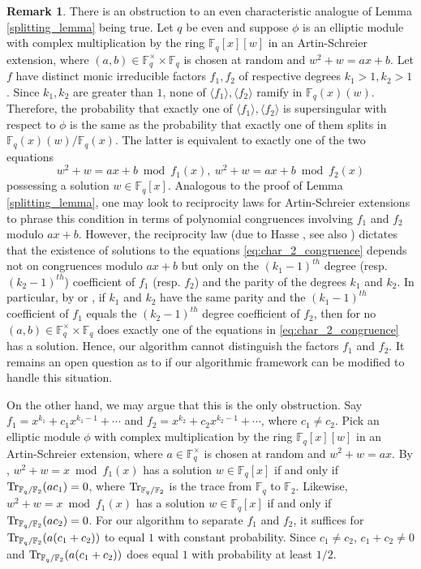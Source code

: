 \documentclass[11pt]{article}
\theoremstyle{definition}
\newtheorem{remark}{Remark}
\def\F{\ensuremath{\mathbb{F}}}
\begin{document}
\begin{remark} \label{rk:obstruction}
There is an obstruction to an even characteristic analogue of Lemma
\ref{splitting_lemma} being true. Let $q$ be even and suppose $\phi$
is an elliptic module with complex multiplication by the ring
$\F_q[x][w]$ in an Artin-Schreier extension, where $(a,b) \in
\F_q^\times \times \F_q$ is chosen at random and $w^2+w=ax+b$. Let $f$
have distinct monic irreducible factors $f_1,f_2$ of respective
degrees $k_1>1,k_2>1$.  Since $k_1,k_2$ are greater than $1$, none of
$\langle f_1\rangle, \langle f_2\rangle$ ramify in
$\F_q(x)(w)$. Therefore, the probability that exactly one of $\langle
f_1\rangle, \langle f_2\rangle$ is supersingular with respect to
$\phi$ is the same as the probability that exactly one of them splits
in $\F_q(x)(w)/\F_q(x)$. The latter is equivalent to exactly one of
the two equations
\begin{equation}\label{eq:char_2_congruence}
  w^2+w = ax+b \bmod f_1(x),\ w^2+w = ax+b \bmod f_2(x)
\end{equation}
possessing a solution $w \in \F_q[x]$. Analogous to the proof of Lemma
\ref{splitting_lemma}, one may look to reciprocity laws for
Artin-Schreier extensions to phrase this condition in terms of
polynomial congruences involving $f_1$ and $f_2$ modulo
$ax+b$. However, the reciprocity law (due to Hasse \cite{Hasse34}, see
also \cite[Theorem 4.2]{Conrad}) dictates that the existence of
solutions to the equations \eqref{eq:char_2_congruence} depends not on
congruences modulo $ax+b$ but only on the $(k_1-1)^{th}$ degree
(resp. $(k_2-1)^{th}$) coefficient of $f_1$ (resp. $f_2$) and the
parity of the degrees $k_1$ and $k_2$. In particular, by
\cite[Theorem~4.2]{Conrad} or \cite[Example~4.1]{Conrad}, if $k_1$ and
$k_2$ have the same parity and the $(k_1-1)^{th}$ coefficient of $f_1$
equals the $(k_2-1)^{th}$ degree coefficient of $f_2$, then for no
$(a,b) \in \F_q^\times \times \F_q$ does exactly one of the equations
in \eqref{eq:char_2_congruence} has a solution. Hence, our algorithm
cannot distinguish the factors $f_1$ and $f_2$. It remains an open
question as to if our algorithmic framework can be modified to handle
this situation. 

On the other hand, we may argue that this is the only obstruction. Say
$f_1 = x^{k_1}+c_1x^{k_1-1}+\cdots$ and $f_2 =
x^{k_2}+c_2x^{k_2-1}+\cdots$, where $c_1 \neq c_2$. Pick an elliptic
module $\phi$ with complex multiplication by the ring $\F_q[x][w]$ in
an Artin-Schreier extension, where $a \in \F_q^\times$ is chosen at
random and $w^2+w=ax$. By \cite[Example 4.1]{Conrad}, $w^2+w = x \bmod
f_1(x)$ has a solution $w \in \F_q[x]$ if and only if
${\rm Tr}_{\F_q/\F_2}(ac_1) = 0$, where ${\rm Tr}_{\F_q/\F_2}$ is the trace from
$\F_q$ to $\F_2$. Likewise, $w^2+w = x \bmod f_1(x)$ has a solution $w
\in \F_q[x]$ if and only if ${\rm Tr}_{\F_q/\F_2}(ac_2) = 0$. For our
algorithm to separate $f_1$ and $f_2$, it suffices for
${\rm Tr}_{\F_q/\F_2}(a(c_1+c_2))$ to equal $1$ with constant
probability. Since $c_1 \neq c_2$, $c_1+c_2 \neq 0$ and
${\rm Tr}_{\F_q/\F_2}(a(c_1+c_2))$ does equal $1$ with probability at least
$1/2$.
\end{remark}
\end{document}
